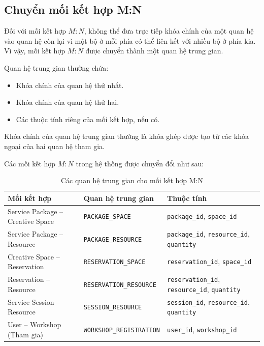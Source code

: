\subsection{Chuyển mối kết hợp M:N}

Đối với mối kết hợp \(M:N\), không thể đưa trực tiếp khóa chính của một quan hệ vào quan hệ còn lại vì một bộ ở mỗi phía có thể liên kết với nhiều bộ ở phía kia. Vì vậy, mối kết hợp \(M:N\) được chuyển thành một quan hệ trung gian.

Quan hệ trung gian thường chứa:

\begin{itemize}
    \item Khóa chính của quan hệ thứ nhất.
    \item Khóa chính của quan hệ thứ hai.
    \item Các thuộc tính riêng của mối kết hợp, nếu có.
\end{itemize}

Khóa chính của quan hệ trung gian thường là khóa ghép được tạo từ các khóa ngoại của hai quan hệ tham gia.

Các mối kết hợp \(M:N\) trong hệ thống được chuyển đổi như sau:

\begin{table}[htbp]
\centering
\begin{tabular}{|p{.25\linewidth}|p{.25\linewidth}|p{.36\linewidth}|}
\hline
\textbf{Mối kết hợp} & \textbf{Quan hệ trung gian} & \textbf{Thuộc tính} \\
\hline
Service Package -- Creative Space &
\texttt{PACKAGE\_SPACE} &
\texttt{package\_id}, \texttt{space\_id} \\
\hline
Service Package -- Resource &
\texttt{PACKAGE\_RESOURCE} &
\texttt{package\_id}, \texttt{resource\_id}, \texttt{quantity} \\
\hline
Creative Space -- Reservation &
\texttt{RESERVATION\_SPACE} &
\texttt{reservation\_id}, \texttt{space\_id} \\
\hline
Reservation -- Resource &
\texttt{RESERVATION\_RESOURCE} &
\texttt{reservation\_id}, \texttt{resource\_id}, \texttt{quantity} \\
\hline
Service Session -- Resource &
\texttt{SESSION\_RESOURCE} &
\texttt{session\_id}, \texttt{resource\_id}, \texttt{quantity} \\
\hline
User -- Workshop (Tham gia) &
\texttt{WORKSHOP\_REGISTRATION} &
\texttt{user\_id}, \texttt{workshop\_id} \\
\hline
\end{tabular}
\caption{Các quan hệ trung gian cho mối kết hợp M:N}
\end{table}

